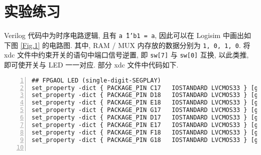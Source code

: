 \documentclass[UTF8,fontset=fandol]{ctexart}
\begin{document}
\section*{实验练习}
\begin{ExQuestions}
  \question Verilog 代码中为时序电路逻辑, 且有 \texttt{a\^\ 1'b1 =~a}, 因此可以在 Logisim 中画出如下图 \ref{Fig.1} 的电路图. 其中, RAM / MUX 内存放的数据分别为 \texttt{1, 0, 1, 0}.
  \question 将 xdc 文件中约束开关的语句中端口信号逆置, 即 \texttt{sw[7]} 与 \texttt{sw[0]} 互换, 以此类推, 即可使开关与 LED 一一对应. 部分 xdc 文件中代码如下. 
  \begin{lstlisting}[basicstyle=\footnotesize\ttfamily, numbers = left, language = XML, frame=lrtb, frameround=tttt, caption={修改后的 xdc 文件}]
## FPGAOL LED (single-digit-SEGPLAY)
set_property -dict { PACKAGE_PIN C17   IOSTANDARD LVCMOS33 } [get_ports { led[0] }];
set_property -dict { PACKAGE_PIN D18   IOSTANDARD LVCMOS33 } [get_ports { led[1] }];
set_property -dict { PACKAGE_PIN E18   IOSTANDARD LVCMOS33 } [get_ports { led[2] }];
set_property -dict { PACKAGE_PIN G17   IOSTANDARD LVCMOS33 } [get_ports { led[3] }];
set_property -dict { PACKAGE_PIN D17   IOSTANDARD LVCMOS33 } [get_ports { led[4] }];
set_property -dict { PACKAGE_PIN E17   IOSTANDARD LVCMOS33 } [get_ports { led[5] }];
set_property -dict { PACKAGE_PIN F18   IOSTANDARD LVCMOS33 } [get_ports { led[6] }];
set_property -dict { PACKAGE_PIN G18   IOSTANDARD LVCMOS33 } [get_ports { led[7] }];


\end{lstlisting}
\end{ExQuestions}
\end{document}
